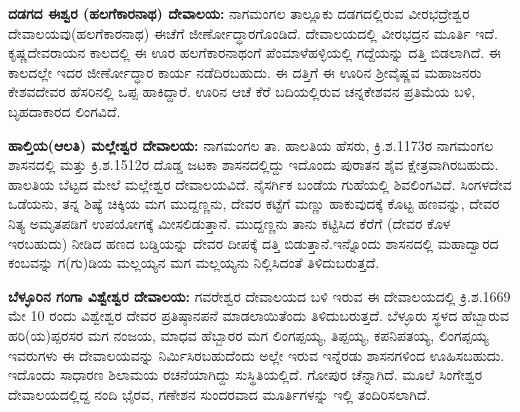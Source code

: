 \textbf{ದಡಗದ ಈಶ್ವರ (ಹಲಗೆಕಾರನಾಥ) ದೇವಾಲಯ: } ನಾಗಮಂಗಲ ತಾಲ್ಲೂಕು ದಡಗದಲ್ಲಿರುವ ವೀರಭದ್ರೇಶ್ವರ ದೇವಾಲಯವು(ಹಲಗೆಕಾರನಾಥ) ಈಚೆಗೆ ಜೀರ್ಣೋದ್ಧಾರಗೊಂಡಿದೆ. ದೇವಾಲಯದಲ್ಲಿ ವೀರಭದ್ರನ ಮೂರ್ತಿ ಇದೆ. ಕೃಷ್ಣದೇವರಾಯನ ಕಾಲದಲ್ಲಿ ಈ ಊರ ಹಲಗೆಕಾರನಾಥಂಗೆ ಪೆಂಮಾಳೆಹಳ್ಳಿಯಲ್ಲಿ ಗದ್ದೆಯನ್ನು ದತ್ತಿ ಬಿಡಲಾಗಿದೆ. ಈ ಕಾಲದಲ್ಲೇ ಇದರ ಜೀರ್ಣೋದ್ಧಾರ ಕಾರ್ಯ ನಡೆದಿರಬಹುದು. ಈ ದತ್ತಿಗೆ ಈ ಊರಿನ ಶ‍್ರೀವೈಷ್ಣವ ಮಹಾಜನರು ಕೇಶವದೇವರ ಹೆಸರಿನಲ್ಲಿ ಒಪ್ಪ ಹಾಕಿದ್ದಾರೆ. ಊರಿನ ಆಚೆ ಕೆರೆ ಬದಿಯಲ್ಲಿರುವ ಚನ್ನಕೇಶವನ ಪ್ರತಿಮೆಯ ಬಳಿ, ಬೃಹದಾಕಾರದ ಲಿಂಗವಿದೆ.

\textbf{ಹಾಲ್ತಿಯ(ಆಲತಿ) ಮಲ್ಲೇಶ್ವರ ದೇವಾಲಯ:} ನಾಗಮಂಗಲ ತಾ. ಹಾಲತಿಯ ಹೆಸರು, ಕ್ರಿ.ಶ.1173ರ ನಾಗಮಂಗಲ ಶಾಸನದಲ್ಲಿ ಮತ್ತು ಕ್ರಿ.ಶ.1512ರ ದೊಡ್ಡ ಜಟಕಾ ಶಾಸನದಲ್ಲಿದ್ದು ಇದೊಂದು ಪುರಾತನ ಶೈವ ಕ್ಷೇತ್ರವಾಗಿರಬಹುದು. ಹಾಲತಿಯ ಬೆಟ್ಟದ ಮೇಲೆ ಮಲ್ಲೇಶ್ವರ ದೇವಾಲಯವಿದೆ. ನೈಸರ್ಗಿಕ ಬಂಡೆಯ ಗುಹೆಯಲ್ಲಿ ಶಿವಲಿಂಗವಿದೆ. ಸಿಂಗಳದೇವ ಒಡೆಯನು, ತನ್ನ ಶಿಷ್ಯೆ ಚಿಕ್ಕಿಯ ಮಗ ಮುದ್ದಣ್ಣನು, ದೇವರ ಕಟ್ಟೆಗೆ ಮಣ್ಣು ಹಾಕುವುದಕ್ಕೆ ಕೊಟ್ಟ ಹಣವನ್ನು, ದೇವರ ನಿತ್ಯ ಅಮೃತಪಡಿಗೆ ಉಪಯೋಗಕ್ಕೆ ಮೀಸಲಿಡುತ್ತಾನೆ. ಮುದ್ದಣ್ಣನು ತಾನು ಕಟ್ಟಿಸಿದ ಕೆರೆಗೆ (ದೇವರ ಕೊಳ ಇರಬಹುದು) ನೀಡಿದ ಹಣದ ಬಡ್ಡಿಯನ್ನು ದೇವರ ದೀಪಕ್ಕೆ ದತ್ತಿ ಬಿಡುತ್ತಾನೆ.ಇನ್ನೊಂದು ಶಾಸನದಲ್ಲಿ ಮಹಾದ್ವಾರದ ಕಂಬವನ್ನು ಗ(ಗು)ಡಿಯ ಮಲ್ಲಯ್ಯನ ಮಗ ಮಲ್ಲಯ್ಯನು ನಿಲ್ಲಿಸಿದಂತೆ ತಿಳಿದುಬರುತ್ತದೆ.

\textbf{ಬೆಳ್ಳೂರಿನ ಗಂಗಾ ವಿಶ್ವೇಶ್ವರ ದೇವಾಲಯ:} ಗವರೇಶ್ವರ ದೇವಾಲಯದ ಬಳಿ ಇರುವ ಈ ದೇವಾಲಯದಲ್ಲಿ ಕ್ರಿ.ಶ.1669 ಮೇ 10 ರಂದು ವಿಶ್ವೇಶ್ವರ ದೇವರ ಪ್ರತಿಷ್ಠಾನಪನೆ ಮಾಡಲಾಯಿತೆಂದು ತಿಳಿದುಬರುತ್ತದೆ. ಬೆಳ್ಳೂರು ಸ್ಥಳದ ಹೆಬ್ಬಾರುವ ಹರಿ(ಯ)ಪ್ಪರಸರ ಮಗ ನಂಜಯ, ಮಾಧವ ಹೆಬ್ಬಾರರ ಮಗ ಲಿಂಗಪ್ಪಯ್ಯ, ತಿಪ್ಪಯ್ಯ, ಕಪನಿಪತಯ್ಯ, ಲಿಂಗಪ್ಪಯ್ಯ ಇವರುಗಳು ಈ ದೇವಾಲಯವನ್ನು ನಿರ್ಮಿಸಿರಬಹುದೆಂದು ಅಲ್ಲೇ ಇರುವ ಇನ್ನೆರಡು ಶಾಸನಗಳಿಂದ ಊಹಿಸ\-ಬಹುದು. ಇದೊಂದು ಸಾಧಾರಣ ಶಿಲಾಮಯ ರಚನೆಯಾಗಿದ್ದು ಸುಸ್ಥಿತಿಯಲ್ಲಿದೆ. ಗೋಪುರ ಚೆನ್ನಾಗಿದೆ. ಮೂಲೆ ಸಿಂಗೇಶ್ವರ ದೇವಾಲಯದಲ್ಲಿದ್ದ ನಂದಿ ಭೈರವ, ಗಣೇಶನ ಸುಂದರವಾದ ಮೂರ್ತಿಗಳನ್ನು ಇಲ್ಲಿ ತಂದಿರಿಸಲಾಗಿದೆ.

\newpage

